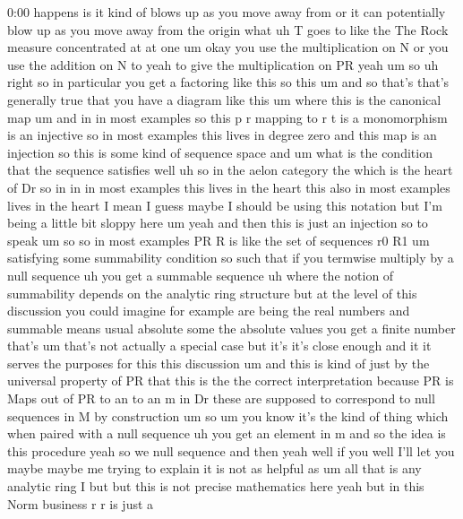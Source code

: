 \begin{unfinished}{0:00}
happens  is  it  kind  of  blows  up  as  you
move  away  from  or  it  can  potentially
blow  up  as  you  move  away  from  the
origin
what  uh  T  goes  to  like  the  The  Rock
measure  concentrated  at  at
one
um  okay  you  use  the  multiplication  on  N
or  you  use  the  addition  on  N  to  yeah  to
give  the  multiplication  on
PR  yeah  um
so  uh  right  so  in  particular  you  get  a
factoring  like  this  so  this
um  and  so  that's  that's  generally  true
that  you  have  a  diagram  like  this  um
where  this  is  the  canonical  map  um  and
in  in  most
examples  so  this  p  r  mapping  to  r  t  is  a
monomorphism  is  an
injective  so  in  most  examples  this  lives
in  degree  zero  and  this  map  is  an
injection  so  this  is  some  kind  of
sequence
space  and
um  what  is  the
condition  that  the  sequence
satisfies
well
uh  so  in  the  aelon  category  the  which  is
the  heart  of
Dr  so  in  in  in  most  examples  this  lives
in  the  heart  this  also  in  most  examples
lives  in  the  heart  I  mean  I  guess  maybe
I  should  be  using  this  notation  but  I'm
being  a  little  bit  sloppy
here
um  yeah  and  then  this  is  just  an
injection  so  to
speak  um  so  so  in  most  examples  PR  R  is
like  the  set  of  sequences  r0  R1  um
satisfying  some  summability  condition
so  such  that  if  you  termwise  multiply  by
a  null
sequence  uh  you  get  a  summable
sequence  uh  where  the  notion  of
summability  depends  on  the  analytic  ring
structure
but  at  the  level  of  this  discussion  you
could  imagine  for  example  are  being  the
real  numbers  and  summable  means  usual
absolute  some  the  absolute  values  you
get  a  finite  number  that's  um  that's  not
actually  a  special  case  but  it's  it's
close  enough  and  it  it  serves  the
purposes  for  this  this  discussion  um  and
this  is  kind  of  just  by  the  universal
property  of  PR  that  this  is  the  the
correct  interpretation  because  PR  is
Maps  out  of  PR  to  an  to  an  m  in  Dr  these
are  supposed  to  correspond  to  null
sequences  in  M  by
construction  um  so
um  you  know  it's  the  kind  of  thing  which
when  paired  with  a  null  sequence  uh  you
get  an  element  in  m  and  so  the  idea  is
this
procedure  yeah  so  we  null  sequence  and
then  yeah
well  if  you  well  I'll  let  you  maybe
maybe  me  trying  to  explain  it  is  not  as
helpful  as
um  all
that  is  any  analytic  ring  I  but  but  this
is  not  precise  mathematics  here  yeah  but
in  this  Norm  business  r  r  is  just  a

\end{unfinished}
